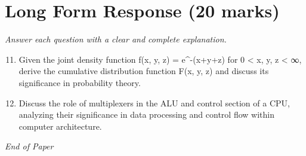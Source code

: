 \documentclass[12pt]{article}
\begin{document}
\section*{Long Form Response (20 marks)}
\textit{Answer each question with a clear and complete explanation.}
\begin{enumerate}[label=\arabic*.]
\setcounter{enumi}{10}
\item Given the joint density function f(x, y, z) = e^-(x+y+z) for 0 \textless{} x, y, z \textless{} ∞, derive the cumulative distribution function F(x, y, z) and discuss its significance in probability theory.
\item Discuss the role of multiplexers in the ALU and control section of a CPU, analyzing their significance in data processing and control flow within computer architecture.
\end{enumerate}

\vfill
\noindent\textit{End of Paper}
\end{document}
